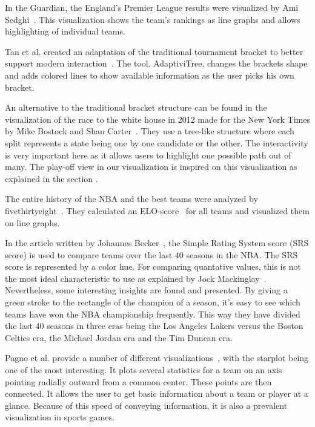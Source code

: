 \documentclass[]{sigchi}
\begin{document}
In the Guardian, the England's Premier League results were visualized by Ami 
Sedghi~\cite{premierleague}. This visualization shows the team's rankings as
line graphs and allows highlighting of individual teams.

Tan et al. created an adaptation of the traditional tournament bracket to better
support modern interaction~\cite{adaptivitree}. The tool, AdaptiviTree, changes
the brackets shape and adds colored lines to show available information as the
user picks his own bracket.

An alternative to the traditional bracket structure can be found in the
visualization of the race to the white house in 2012 made for the New York Times
by Mike Bostock and Shan Carter~\cite{whitehousepath}. They use a tree-like
structure where each split represents a state being one by one candidate or the
other. The interactivity is very important here as it allows users to highlight
one possible path out of many. The play-off view in our visualization is inspired on this visualization as explained in the section .

The entire history of the NBA and the best teams were analyzed by
fivethirtyeight~\cite{fivethirtyeight}. They calculated an ELO-score~\cite{elorating} 
for all teams and visualized them on line graphs. 

In the article written by Johannes Becker~\cite{nbaempires}, the Simple Rating System 
score (SRS score) is used to compare teams over the last 40 seasons in the NBA. The 
SRS score is represented by a color hue. For comparing quantative values, this is 
not the most ideal characteristic to use as explained by Jock Mackinglay~\cite{automatingdesign}. Nevertheless, some interesting insights are found and presented. By giving a green stroke to the rectangle of the champion of a season, 
it's easy to see which teams have won the NBA championship frequently. This way 
they have divided the last 40 seasons in three eras being the Los Angeles Lakers 
versus the Boston Celtics era, the Michael Jordan era and the Tim Duncan era. 

Pagno et al. provide a number of different visualizations~\cite{starplots}, with the starplot being one of the most interesting. It plots several statistics for a team on an axis pointing radially outward from a common center. These points are then
connected. It allows the user to get basic information about a team or player at
a glance. Because of this speed of conveying information, it is also a prevalent
visualization in sports games.
\end{document}

